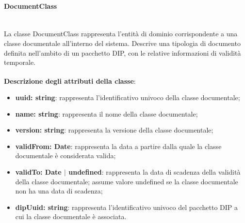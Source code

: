 \documentclass[a4paper,12pt]{article}
\begin{document}
{{{                \paragraph{DocumentClass}\label{par:DocumentClass}\mbox{}\\
                La classe DocumentClass rappresenta l'entità di dominio corrispondente a una classe documentale all'interno del sistema. Descrive una tipologia di documento definita nell'ambito di un pacchetto DIP, con le relative informazioni di validità temporale.\\
                \\
                \textbf{Descrizione degli attributi della classe}:
                \begin{itemize}
                    \item \textbf{uuid: string}: rappresenta l'identificativo univoco della classe documentale;
                    \item \textbf{name: string}: rappresenta il nome della classe documentale;
                    \item \textbf{version: string}: rappresenta la versione della classe documentale;
                    \item \textbf{validFrom: Date}: rappresenta la data a partire dalla quale la classe documentale è considerata valida;
                    \item \textbf{validTo: Date $|$ undefined}: rappresenta la data di scadenza della validità della classe documentale; assume valore undefined se la classe documentale non ha una data di scadenza;
                    \item \textbf{dipUuid: string}: rappresenta l'identificativo univoco del pacchetto DIP a cui la classe documentale è associata.
                \end{itemize}

}}}
\end{document}
